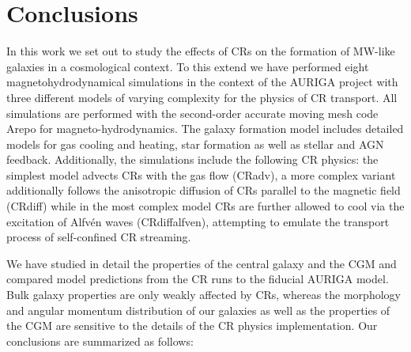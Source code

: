 \documentclass[useAMS,usenatbib]{mnras}
\begin{document}
\section{Conclusions} \label{sec:conc}


In this work we set out to study the effects of CRs on the formation of MW-like galaxies in a cosmological context. To this extend we have performed eight magnetohydrodynamical simulations in the context of the AURIGA project \citep{Grand2017} with three different models of varying complexity for the physics of CR transport. All simulations are performed with the second-order accurate moving mesh code Arepo \citep{Springel2010,Pakmor2016c} for magneto-hydrodynamics. The galaxy formation model includes detailed models for gas cooling and heating, star formation as well as stellar and AGN feedback. Additionally, the simulations include the following CR physics: the simplest model advects CRs with the gas flow (CRadv), a more complex variant additionally follows the anisotropic diffusion of CRs parallel to the magnetic field (CRdiff) while in the most complex model CRs are further allowed to cool via the excitation of Alfv\'en waves (CRdiffalfven), attempting to emulate the transport process of self-confined CR streaming.

We have studied in detail the properties of the central galaxy and the CGM and compared model predictions from the CR runs to the fiducial AURIGA model. Bulk galaxy properties are only weakly affected by CRs, whereas the morphology and angular momentum distribution of our galaxies as well as the properties of the CGM are sensitive to the details of the CR physics implementation. Our conclusions are summarized as follows:
\end{document}
